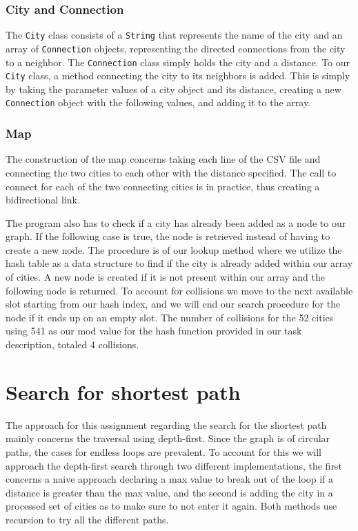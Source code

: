 \documentclass[a4paper,11pt]{article}
\begin{document}
        \subsubsection*{City and Connection}

            The \texttt{City} class consists of a \texttt{String} that represents the name of the city and an array of \texttt{Connection} objects, representing the directed connections from the city to a neighbor. The \texttt{Connection} class simply holds the city and a distance. To our \texttt{City} class, a method connecting the city to its neighbors is added. This is simply by taking the parameter values of a city object and its distance, creating a new \texttt{Connection} object with the following values, and adding it to the array.

        \subsubsection*{Map}

            The construction of the map concerns taking each line of the CSV file and connecting the two cities to each other with the distance specified. The call to connect for each of the two connecting cities is in practice, thus creating a bidirectional link. 
            
            The program also has to check if a city has already been added as a node to our graph. If the following case is true, the node is retrieved instead of having to create a new node. The procedure is of our lookup method where we utilize the hash table as a data structure to find if the city is already added within our array of cities. A new node is created if it is not present within our array and the following node is returned. To account for collisions we move to the next available slot starting from our hash index, and we will end our search procedure for the node if it ends up on an empty slot. The number of collisions for the 52 cities using 541 as our mod value for the hash function provided in our task description, totaled 4 collisions.

\section*{Search for shortest path}

    The approach for this assignment regarding the search for the shortest path mainly concerns the traversal using depth-first. Since the graph is of circular paths, the cases for endless loops are prevalent. To account for this we will approach the depth-first search through two different implementations, the first concerns a naive approach declaring a max value to break out of the loop if a distance is greater than the max value, and the second is adding the city in a processed set of cities as to make sure to not enter it again. Both methods use recursion to try all the different paths.
\end{document}
